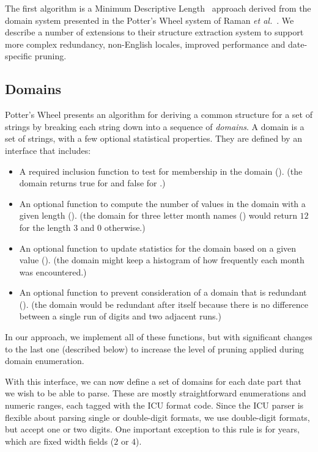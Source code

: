 The first algorithm is a Minimum Descriptive Length~\cite{Rissanen:1978} approach derived from the domain system presented in the Potter's Wheel system of Raman \textit{et al.}~\cite{Raman:2001}. We describe a number of extensions to their structure extraction system to support more complex redundancy, non-English locales, improved performance and date-specific pruning.

\subsection{Domains}
Potter's Wheel presents an algorithm for deriving a common structure for a set of strings by breaking each string down into a sequence of \textit{domains}. A domain is a set of strings, with a few optional statistical properties. They are defined by an interface that includes:
\begin{itemize}
\setlength\itemsep{0em}
\item A required inclusion function to test for membership in the domain (). 
(\eg the domain  returns true for  
and false for .)
\item An optional function to compute the number of values in the domain with a given length ().
(\eg the domain for three letter month names () would return $12$ for the length $3$ and $0$ otherwise.)
\item An optional function to update statistics for the domain based on a given value ().
(\eg the domain  might keep a histogram of how frequently each month was encountered.)
\item An optional function to prevent consideration of a domain that is redundant ().
(\eg  the domain  would be redundant after itself because there is no difference between a single run of digits and two adjacent runs.)
\end{itemize}

In our approach, we implement all of these functions, but with significant changes to the last one (described below) to increase the level of pruning applied during
domain enumeration.

With this interface, we can now define a set of domains for each date part that we wish to be able to parse. These are mostly straightforward enumerations and numeric ranges, each tagged with the ICU format code. Since the ICU parser is flexible about parsing single or double-digit formats, we use double-digit formats, but accept one or two digits. One important exception to this rule is for years, which are fixed width fields ($2$ or $4$).

